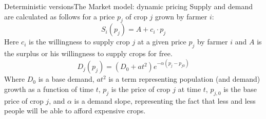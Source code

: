 \documentclass[10pt, aspectratio=169]{beamer}
\def\aa{Deterministic versions}
\def\aac{The Market model: dynamic pricing}
\begin{document}
\begin{frame}{\aa}{\aac}
    Supply and demand are calculated as follows for a price $p_j$ of crop $j$ grown by farmer $i$:\\
    \begin{equation}
      S_i(p_j) = A + c_i \cdot p_j
    \end{equation}
  Here $c_i$ is the willingness to supply crop $j$  at a given price $p_j$ by farmer $i$ and $A$ is the surplus or his willingness to supply crops for free.
  \begin{equation}
    D_j(p_j) = \left( D_0 + at^2 \right) e^{-\alpha (p_j-p_{j0})}
  \end{equation}
Where $D_0$ is a base demand, $at^2$ is a term representing population (and demand) growth as a function of time $t$, $p_j$ is the price of crop $j$ at time $t$, $p_{j,0}$ is the base price of crop $j$, and $\alpha$ is a demand slope, representing the fact that less and less people will be able to afford expensive crops.
\end{frame}

\end{document}
